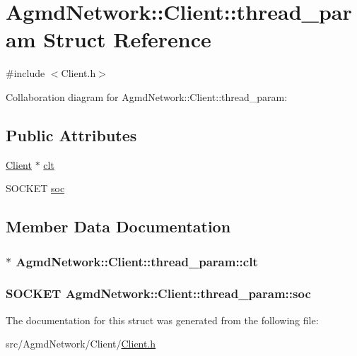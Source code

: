 \hypertarget{struct_agmd_network_1_1_client_1_1thread__param}{\section{Agmd\+Network\+:\+:Client\+:\+:thread\+\_\+param Struct Reference}
\label{struct_agmd_network_1_1_client_1_1thread__param}
}


{\ttfamily \#include $<$Client.\+h$>$}



Collaboration diagram for Agmd\+Network\+:\+:Client\+:\+:thread\+\_\+param\+:
\subsection*{Public Attributes}
\begin{DoxyCompactItemize}
\item 
\hyperlink{class_agmd_network_1_1_client}{Client} $\ast$ \hyperlink{struct_agmd_network_1_1_client_1_1thread__param_afdf3dc4843047849eb283a242441c6e0}{clt}
\item 
S\+O\+C\+K\+E\+T \hyperlink{struct_agmd_network_1_1_client_1_1thread__param_a53e4d946c18418fc9a740c052f412ecb}{soc}
\end{DoxyCompactItemize}


\subsection{Member Data Documentation}
\hypertarget{struct_agmd_network_1_1_client_1_1thread__param_afdf3dc4843047849eb283a242441c6e0}{
\subsubsection[{clt}]{$\ast$ Agmd\+Network\+::\+Client\+::thread\+\_\+param\+::clt}}\label{struct_agmd_network_1_1_client_1_1thread__param_afdf3dc4843047849eb283a242441c6e0}
\hypertarget{struct_agmd_network_1_1_client_1_1thread__param_a53e4d946c18418fc9a740c052f412ecb}{
\subsubsection[{soc}]{\setlength{\rightskip}{0pt plus 5cm}S\+O\+C\+K\+E\+T Agmd\+Network\+::\+Client\+::thread\+\_\+param\+::soc}}\label{struct_agmd_network_1_1_client_1_1thread__param_a53e4d946c18418fc9a740c052f412ecb}


The documentation for this struct was generated from the following file\+:\begin{DoxyCompactItemize}
\item 
src/\+Agmd\+Network/\+Client/\hyperlink{_client_8h}{Client.\+h}\end{DoxyCompactItemize}
